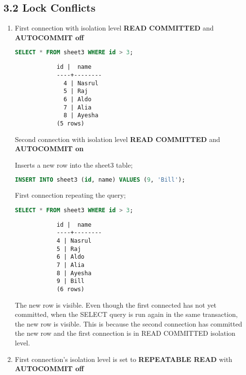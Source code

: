 \documentclass{article}
\begin{document}
    \subsection{3.2 Lock Conflicts}
    \begin{enumerate}[label=\alph*)]
        \item First connection with isolation level \textbf{READ COMMITTED} and \textbf{AUTOCOMMIT off}

        \begin{lstlisting}[language=sql]
SELECT * FROM sheet3 WHERE id > 3;
        \end{lstlisting}

        \begin{lstlisting}
            id |  name  
            ----+--------
              4 | Nasrul
              5 | Raj
              6 | Aldo
              7 | Alia
              8 | Ayesha
            (5 rows)
        \end{lstlisting}

        Second connection with isolation level \textbf{READ COMMITTED} and \textbf{AUTOCOMMIT on}

        Inserts a new row into the sheet3 table;

        \begin{lstlisting}[language=sql]
INSERT INTO sheet3 (id, name) VALUES (9, 'Bill');
        \end{lstlisting}

        First connection repeating the query;
        \begin{lstlisting}[language=sql]
SELECT * FROM sheet3 WHERE id > 3;
        \end{lstlisting}

        \begin{lstlisting}
            id |  name  
            ----+--------
            4 | Nasrul
            5 | Raj
            6 | Aldo
            7 | Alia
            8 | Ayesha
            9 | Bill
            (6 rows)
        \end{lstlisting}

The new row is visible. Even though the first connected has not yet committed, when the SELECT query is run again in the same transaction, the new row is visible. This is because the second connection has committed the new row and the first connection is in READ COMMITTED isolation level.
        
        \item First connection's isolation level is set to \textbf{REPEATABLE READ} with \textbf{AUTOCOMMIT off}


\end{enumerate}
\end{document}
